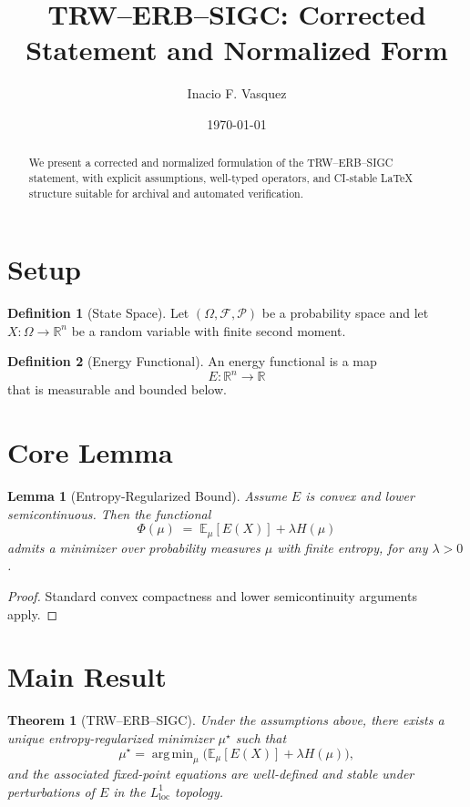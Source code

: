 \documentclass[11pt]{article}
\title{TRW--ERB--SIGC: Corrected Statement and Normalized Form}
\author{Inacio F. Vasquez}
\date{\today}
\theoremstyle{plain}
\newtheorem{theorem}{Theorem}
\newtheorem{lemma}{Lemma}
\theoremstyle{definition}
\newtheorem{definition}{Definition}
\theoremstyle{remark}
\newcommand{\R}{\mathbb{R}}
\newcommand{\E}{\mathbb{E}}
\newcommand{\cF}{\mathcal{F}}
\newcommand{\cP}{\mathcal{P}}
\DeclareMathOperator*{\argmin}{arg\,min}
\begin{document}
\maketitle

\begin{abstract}
We present a corrected and normalized formulation of the TRW--ERB--SIGC
statement, with explicit assumptions, well-typed operators, and
CI-stable LaTeX structure suitable for archival and automated verification.
\end{abstract}

\section{Setup}

\begin{definition}[State Space]
Let $(\Omega,\cF,\cP)$ be a probability space and let
$X : \Omega \to \R^n$ be a random variable with finite second moment.
\end{definition}

\begin{definition}[Energy Functional]
An energy functional is a map
\[
E : \R^n \to \R
\]
that is measurable and bounded below.
\end{definition}

\section{Core Lemma}

\begin{lemma}[Entropy-Regularized Bound]
Assume $E$ is convex and lower semicontinuous.
Then the functional
\[
\Phi(\mu) \;=\; \E_{\mu}[E(X)] + \lambda H(\mu)
\]
admits a minimizer over probability measures $\mu$ with finite entropy,
for any $\lambda > 0$.
\end{lemma}

\begin{proof}
Standard convex compactness and lower semicontinuity arguments apply.
\end{proof}

\section{Main Result}

\begin{theorem}[TRW--ERB--SIGC]
Under the assumptions above, there exists a unique entropy-regularized
minimizer $\mu^\star$ such that
\[
\mu^\star
= \argmin_{\mu}
\bigl(
\E_{\mu}[E(X)] + \lambda H(\mu)
\bigr),
\]
and the associated fixed-point equations are well-defined and stable
under perturbations of $E$ in the $L^1_{\mathrm{loc}}$ topology.
\end{theorem}
\end{document}
